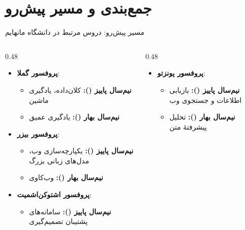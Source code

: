 \section{جمع‌بندی و مسیر پیش‌رو}

\begin{frame}{مسیر پیش‌رو: دروس مرتبط در دانشگاه مانهایم}{}
\begin{columns}[T,onlytextwidth]
\begin{column}{0.48\textwidth}
\begin{itemize}\small\setlength{\itemsep}{6pt}
    \item \textbf{پروفسور گملا}: 
    \begin{itemize}\footnotesize\setlength{\itemsep}{2pt}
        \item \textbf{نیم‌سال پاییز ():} کلان‌داده، یادگیری ماشین
        \item \textbf{نیم‌سال بهار ():} یادگیری عمیق 
    \end{itemize}
    \item \textbf{پروفسور بیزر}: 
    \begin{itemize}\footnotesize\setlength{\itemsep}{2pt}
        \item \textbf{نیم‌سال پاییز ():} یکپارچه‌سازی وب، مدل‌های زبانی بزرگ
        \item \textbf{نیم‌سال بهار ():} وب‌کاوی 
    \end{itemize}
    \item \textbf{پروفسور اشتوکن‌اشمیت}: 
    \begin{itemize}\footnotesize\setlength{\itemsep}{2pt}
        \item \textbf{نیم‌سال پاییز ():} سامانه‌های پشتیبان تصمیم‌گیری
    \end{itemize}
\end{itemize}
\end{column}%
\begin{column}{0.48\textwidth}
\begin{itemize}\small\setlength{\itemsep}{6pt}
    \item \textbf{پروفسور پونزتو}: 
    \begin{itemize}\footnotesize\setlength{\itemsep}{2pt}
        \item \textbf{نیم‌سال پاییز ():} بازیابی اطلاعات و جستجوی وب
        \item \textbf{نیم‌سال بهار ():} تحلیل پیشرفتهٔ متن 

\end{itemize}
\end{itemize}
\end{column}
\end{columns}
\end{frame}
